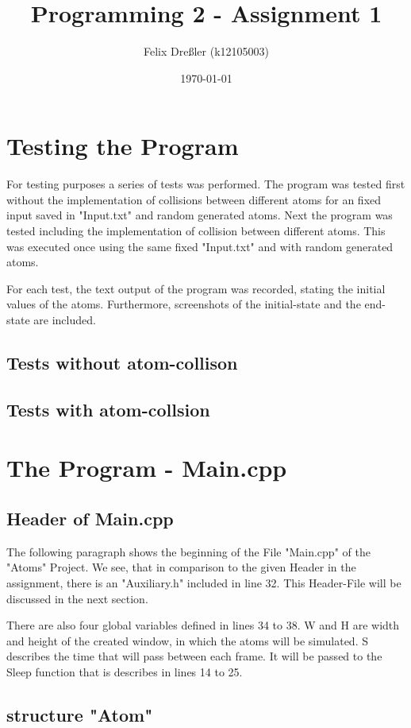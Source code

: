 \documentclass[11pt,titlepage]{article}
\title{Programming 2 - Assignment 1}
\author{Felix Dreßler (k12105003)}
\date{\today} %
\def\ContinueLineNumber{\lstset{firstnumber=last}}
\begin{document}
\maketitle
	\section{Testing the Program}
		For testing purposes a series of tests was performed. The program was tested first without the implementation of collisions between different atoms for an fixed input saved in "Input.txt" and random generated atoms.
		Next the program was tested including the implementation of collision between different atoms. This was executed once using the same fixed "Input.txt" and with random generated atoms.
		
		For each test, the text output of the program was recorded, stating the initial values of the atoms. Furthermore, screenshots of the initial-state and the end-state are included.
		\subsection{Tests without atom-collison}
		
		\subsection{Tests with atom-collsion}
		
	\section{The Program - Main.cpp}	
		\subsection{Header of Main.cpp}
			The following paragraph shows the beginning of the File "Main.cpp" of the "Atoms" Project. 
			We see, that in comparison to the given Header in the assignment, there is an "Auxiliary.h" included in line 32. This Header-File will be discussed in the next section.
			
			There are also four global variables defined in lines 34 to 38. W and H are width and height of the created window, in which the atoms will be simulated.
			S describes the time that will pass between each frame. It will be passed to the Sleep function that is describes in lines 14 to 25.
			
			
			
		\subsection{structure "Atom"}	
			\ContinueLineNumber
			
			
\end{document}
